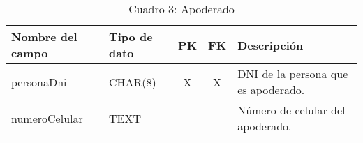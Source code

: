 \begin{table}[H]
	\centering
	\begin{tabular}{|l|l|c|c|l|}
		\hline
		\textbf{Nombre del campo} & \textbf{Tipo de dato} & \textbf{PK} & \textbf{FK} & \textbf{Descripción}                \\
		\hline
		personaDni                & CHAR(8)               & X           & X           & DNI de la persona que es apoderado. \\
		\hline
		numeroCelular             & TEXT                  &             &             & Número de celular del apoderado.    \\
		\hline
	\end{tabular}
	\caption{Cuadro 3: Apoderado}
\end{table}